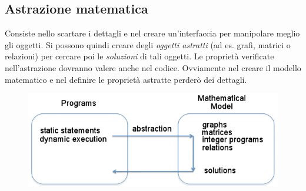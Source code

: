 \documentclass[a4paper,oneside,titlepage]{book}
\begin{document}
\subsection{Astrazione matematica}
Consiste nello scartare i dettagli e nel creare un'interfaccia per manipolare meglio gli oggetti. Si possono quindi creare degli \textit{oggetti astratti} (ad es. grafi, matrici o relazioni) per cercare poi le \textit{soluzioni} di tali oggetti. Le proprietà verificate nell'astrazione dovranno valere anche nel codice. Ovviamente nel creare il modello matematico e nel definire le proprietà astratte perderò dei dettagli.
\begin{figure}[htp]
	\centering
	\includegraphics[width=\textwidth, height=\textheight, keepaspectratio]{absMat.png}
\end{figure}
\end{document}
